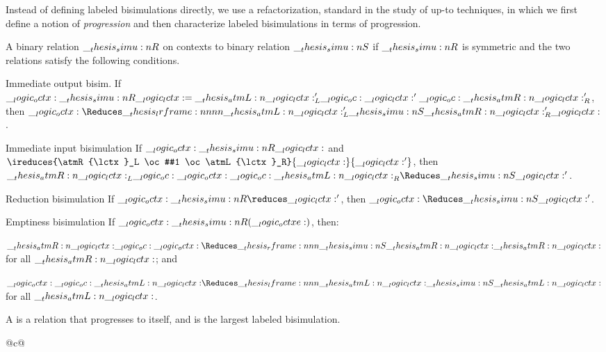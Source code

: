 Instead of defining labeled bisimulations directly, we use a refactorization, standard in the study of up-to techniques\autocite{??}, in which we first define a notion of \emph{progression} and then characterize labeled bisimulations in terms of progression.
\begin{definition}
  A binary relation $\__thesis_simu:n {R}$ on contexts  to binary relation $\__thesis_simu:n {S}$ if $\__thesis_simu:n {R}$ is symmetric and the two relations satisfy the following conditions.
  \begin{thmdescription}[nosep]
  \item[Immediate output bisim.]
    If $\__logic_octx: \__thesis_simu:n {R} \__logic_lctx: = \__thesis_atmL:n {\__logic_lctx:}'_L \__logic_oc: \__logic_lctx:' \__logic_oc: \__thesis_atmR:n {\__logic_lctx:}'_R$, then $\octx \Reduces\lrframe{\atmL{\lctx}'_L}{\simu{S}}{\atmR{\lctx}'_R} \lctx$.
  \item[Immediate input bisimulation]
    If $\__logic_octx: \__thesis_simu:n {R} \__logic_lctx:$ and $\ireduces{\atmR{\lctx}_L \oc #1 \oc \atmL{\lctx}_R}{\lctx}{\lctx'}$, then\\$\atmR{\lctx}_L \oc \octx \oc \atmL{\lctx}_R \Reduces\simu{S} \lctx'$.
  \item[Reduction bisimulation]
    If $\octx \simu{R}\reduces \lctx'$, then $\octx \Reduces\simu{S} \lctx'$.
  \item[Emptiness bisimulation]
    If $\__logic_octx: \__thesis_simu:n {R} (\__logic_octxe:)$, then:
    \begin{itemize*}[label=, afterlabel=]
    \item $\atmR{\lctx} \oc \octx \Reduces\rframe{\simu{S}}{\atmR{\lctx}} \atmR{\lctx}$ for all $\__thesis_atmR:n {\__logic_lctx:}$; and
    \item $\octx \oc \atmL{\lctx} \Reduces\lframe{\atmL{\lctx}}{\simu{S}} \atmL{\lctx}$ for all $\__thesis_atmL:n {\__logic_lctx:}$.
    \end{itemize*}
  \end{thmdescription}
  A  is a relation that progresses to itself, and  is the largest labeled bisimulation.
  \begin{marginfigure}
    \begin{center}
      \begin{tabular}{@{}c@{}}
\end{tabular}
\end{center}
\end{marginfigure}
\end{definition}

